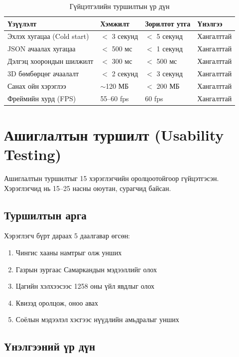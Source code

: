 \begin{table}[htbp]
\centering
\begin{tabular}{|p{5cm}|p{3cm}|p{3cm}|p{2.5cm}|}
\hline
\textbf{Үзүүлэлт} & \textbf{Хэмжилт} & \textbf{Зорилтот утга} & \textbf{Үнэлгээ} \\
\hline
Эхлэх хугацаа (Cold start) & $<$ 3 секунд & $<$ 5 секунд & Хангалттай \\
\hline
JSON ачаалах хугацаа & $<$ 500 мс & $<$ 1 секунд & Хангалттай \\
\hline
Дэлгэц хоорондын шилжилт & $<$ 300 мс & $<$ 500 мс & Хангалттай \\
\hline
3D бөмбөрцөг ачаалалт & $<$ 2 секунд & $<$ 3 секунд & Хангалттай \\
\hline
Санах ойн хэрэглээ & $\sim$120 МБ & $<$ 200 МБ & Хангалттай \\
\hline
Фреймийн хурд (FPS) & 55--60 fps & 60 fps & Хангалттай \\
\hline
\end{tabular}
\caption{Гүйцэтгэлийн туршилтын үр дүн}
\label{tab:performance_tests}
\end{table}

\section{Ашиглалтын туршилт (Usability Testing)}

Ашиглалтын туршилтыг 15 хэрэглэгчийн оролцоотойгоор гүйцэтгэсэн. Хэрэглэгчид нь 15--25 насны оюутан, сурагчид байсан.

\subsection{Туршилтын арга}

Хэрэглэгч бүрт дараах 5 даалгавар өгсөн:
\begin{enumerate}
	\item Чингис хааны намтрыг олж унших
	\item Газрын зургаас Самаркандын мэдээллийг олох
	\item Цагийн хэлхээсээс 1258 оны үйл явдлыг олох
	\item Квизэд оролцож, оноо авах
	\item Соёлын мэдээлэл хэсгээс нүүдлийн амьдралыг унших
\end{enumerate}

\subsection{Үнэлгээний үр дүн}

